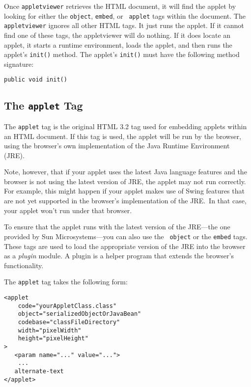 Once {\tt appletviewer} retrieves the HTML document, it will find the
applet by looking for either the {\tt object}, {\tt embed}, or {\tt
applet} tags within the document.  The {\tt appletviewer} ignores all
other HTML tags.   It just runs the applet.  If it cannot find one of
these tags, the appletviewer will do nothing.   If it does locate an
applet, it starts a runtime environment, loads the applet, and then
runs the applet's {\tt init()} method.  The applet's {\tt init()} must
have the following method signature:

\begin{jjjlisting}
\begin{lstlisting}
public void init()
\end{lstlisting}
\end{jjjlisting}

\subsection*{The {\tt applet} Tag}
\noindent 
The {\tt applet} tag is the original HTML 3.2 tag used for embedding
applets within an HTML document.  If this tag is used, the applet will
be run by the browser, using the browser's own implementation of the
Java Runtime Environment (JRE).

\spstrict Note, however, that if your applet uses the latest Java language
features and the browser is not using the latest version of JRE, the
applet may not run correctly.  For example, this might happen if your
applet makes use of Swing features that are not yet supported in the
browser's implementation of the JRE.~In that case, your applet won't
run under that browser.\spnormalstr


To ensure that the applet runs with the latest version of the JRE---the 
one provided by Sun Microsystems---you can also use the {\tt
object} or the {\tt embed} tags.  These tags are used to load the
appropriate version of the JRE into the browser as a {\it plugin}
module.   A plugin is a helper program that extends the browser's
functionality.

The {\tt applet} tag takes the following form:

\begin{jjjlisting}
\begin{lstlisting}
<applet
    code="yourAppletClass.class"
    object="serializedObjectOrJavaBean"
    codebase="classFileDirectory"
    width="pixelWidth"
    height="pixelHeight"
>
   <param name="..." value="...">
    ...
   alternate-text
</applet>
\end{lstlisting}
\end{jjjlisting}

